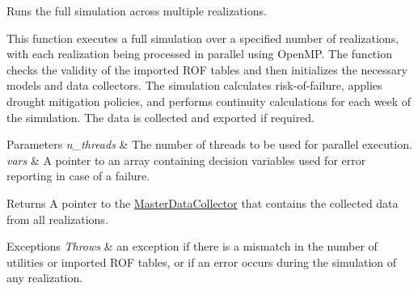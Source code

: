 Runs the full simulation across multiple realizations. 

This function executes a full simulation over a specified number of realizations, with each realization being processed in parallel using Open\+MP. The function checks the validity of the imported R\+OF tables and then initializes the necessary models and data collectors. The simulation calculates risk-\/of-\/failure, applies drought mitigation policies, and performs continuity calculations for each week of the simulation. The data is collected and exported if required.


\begin{DoxyParams}{Parameters}
{\em n\+\_\+threads} & The number of threads to be used for parallel execution. \\
\hline
{\em vars} & A pointer to an array containing decision variables used for error reporting in case of a failure.\\
\hline
\end{DoxyParams}
\begin{DoxyReturn}{Returns}
A pointer to the {\ttfamily \mbox{\hyperlink{classMasterDataCollector}{Master\+Data\+Collector}}} that contains the collected data from all realizations.
\end{DoxyReturn}

\begin{DoxyExceptions}{Exceptions}
{\em Throws} & an exception if there is a mismatch in the number of utilities or imported R\+OF tables, or if an error occurs during the simulation of any realization. \\
\hline
\end{DoxyExceptions}
\mbox{\label{classSimulation_ac9ff965191f13b1ce044344fd1e5d0ac}} 
